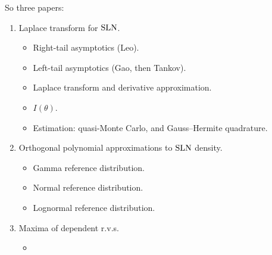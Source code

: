 So three papers:
\begin{enumerate}
	\item Laplace transform for $\mathrm{SLN}$.
		\begin{itemize}
			\item Right-tail asymptotics (Leo).
			\item Left-tail asymptotics (Gao, then Tankov).
			\item Laplace transform and derivative approximation.
			\item $I(\theta)$.
			\item Estimation: quasi-Monte Carlo, and Gauss--Hermite quadrature.
		\end{itemize}
	\item Orthogonal polynomial approximations to $\mathrm{SLN}$ density.
		\begin{itemize}
			\item Gamma reference distribution.
			\item Normal reference distribution.
			\item Lognormal reference distribution.
		\end{itemize}
	\item Maxima of dependent r.v.s.
		\begin{itemize}
			\item
		\end{itemize}
\end{enumerate}

